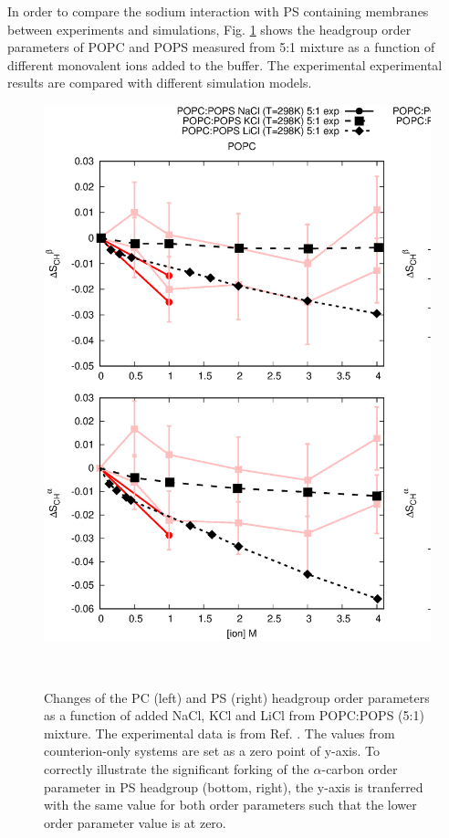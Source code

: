 \documentclass[aps,prl,superscriptaddress,twocolumn]{revtex4}
\begin{document}
In order to compare the sodium interaction with PS containing membranes between
experiments and simulations, Fig. \ref{PSresponseTONaCl} shows the headgroup
order parameters of POPC and POPS measured from 5:1 mixture as a
function of different monovalent ions added to the buffer.
The experimental experimental results \cite{roux86} are compared with different simulation
models.
\begin{figure}[]
  \centering
  \includegraphics[width=18.0cm]{../Figs/CHANGESwithMONVALENTwithPS.eps}
  \caption{\label{PSresponseTONaCl}
    Changes of the PC (left) and PS (right) headgroup order parameters as a function of
    added NaCl, KCl and LiCl from POPC:POPS (5:1) mixture. The experimental data is from Ref. .
    The values from counterion-only systems are set as a zero point of y-axis.
    To correctly illustrate the significant forking of the $\alpha$-carbon order parameter
    in PS headgroup (bottom, right), the y-axis is tranferred with the same value for both order parameters such that the lower order
    parameter value is at zero.
  }
   \\
\end{figure}
\end{document}
